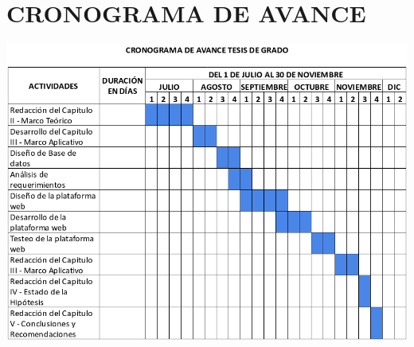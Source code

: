 \chapter{CRONOGRAMA DE AVANCE}

\begin{center}
    \includegraphics[scale=1.1]{imagenes/cronograma.png}
\end{center}